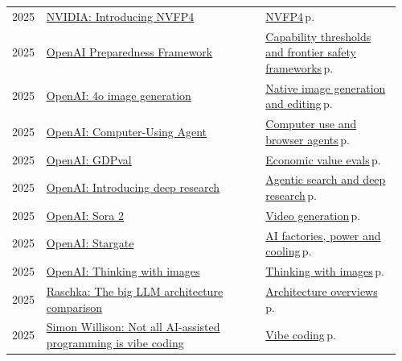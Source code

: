 \documentclass[10pt,a4paper,openany]{report}
\begin{document}
{\begin{longtable}{@{}p{0.07\linewidth}>{\raggedright}p{0.55\linewidth}>{\raggedright\arraybackslash}p{0.34\linewidth}@{}}
2025 & \href{https://developer.nvidia.com/blog/introducing-nvfp4-for-efficient-and-accurate-low-precision-inference/}{NVIDIA: Introducing NVFP4} & \hyperref[c:quant-1]{NVFP4}\,{\color{muted}\scriptsize p.\,\pageref{c:quant-1}}\\
2025 & \href{https://openai.com/index/updating-our-preparedness-framework/}{OpenAI Preparedness Framework} & \hyperref[c:safety-0]{Capability thresholds and frontier safety frameworks}\,{\color{muted}\scriptsize p.\,\pageref{c:safety-0}}\\
2025 & \href{https://openai.com/index/introducing-4o-image-generation/}{OpenAI: 4o image generation} & \hyperref[c:vlm-8]{Native image generation and editing}\,{\color{muted}\scriptsize p.\,\pageref{c:vlm-8}}\\
2025 & \href{https://openai.com/index/computer-using-agent/}{OpenAI: Computer-Using Agent} & \hyperref[c:agents-9]{Computer use and browser agents}\,{\color{muted}\scriptsize p.\,\pageref{c:agents-9}}\\
2025 & \href{https://openai.com/index/gdpval/}{OpenAI: GDPval} & \hyperref[c:evals-7]{Economic value evals}\,{\color{muted}\scriptsize p.\,\pageref{c:evals-7}}\\
2025 & \href{https://openai.com/index/introducing-deep-research/}{OpenAI: Introducing deep research} & \hyperref[c:context-6]{Agentic search and deep research}\,{\color{muted}\scriptsize p.\,\pageref{c:context-6}}\\
2025 & \href{https://openai.com/index/sora-2/}{OpenAI: Sora 2} & \hyperref[c:embodied-6]{Video generation}\,{\color{muted}\scriptsize p.\,\pageref{c:embodied-6}}\\
2025 & \href{https://openai.com/index/announcing-the-stargate-project/}{OpenAI: Stargate} & \hyperref[c:hardware-12]{AI factories, power and cooling}\,{\color{muted}\scriptsize p.\,\pageref{c:hardware-12}}\\
2025 & \href{https://openai.com/index/thinking-with-images/}{OpenAI: Thinking with images} & \hyperref[c:vlm-3]{Thinking with images}\,{\color{muted}\scriptsize p.\,\pageref{c:vlm-3}}\\
2025 & \href{https://magazine.sebastianraschka.com/p/the-big-llm-architecture-comparison}{Raschka: The big LLM architecture comparison} & \hyperref[c:arch-12]{Architecture overviews}\,{\color{muted}\scriptsize p.\,\pageref{c:arch-12}}\\
2025 & \href{https://simonwillison.net/2025/Mar/19/vibe-coding/}{Simon Willison: Not all AI-assisted programming is vibe coding} & \hyperref[c:coding-1]{Vibe coding}\,{\color{muted}\scriptsize p.\,\pageref{c:coding-1}}\\

\end{longtable}}
\end{document}
